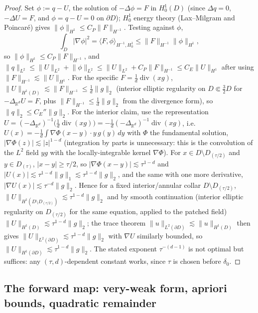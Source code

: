 \documentclass[11pt]{article}
\theoremstyle{remark}
\newcommand{\R}{\mathbb{R}}
\newcommand{\norm}[1]{\lVert #1\rVert}
\newcommand{\abs}[1]{\lvert #1\rvert}
\newcommand{\inner}[2]{\langle #1,#2\rangle}
\DeclareMathOperator{\diver}{div}
\begin{document}
\begin{proof}
Set $\phi:=q-U$, the solution of $-\Delta\phi=F$ in $H^{1}_{0}(D)$
(since $\Delta q=0$, $-\Delta U=F$, and $\phi=q-U=0$ on $\partial D$);
$H^{1}_0$ energy theory (Lax--Milgram and Poincar\'e) gives
$\norm{\phi}_{H^{1}}\le C_P\norm{F}_{H^{-1}}$. Testing against $\phi$,
\[
\int_D\abs{\nabla\phi}^{2}
=\inner{F}{\phi}_{H^{-1},H^{1}_0}
\le\norm{F}_{H^{-1}}\norm{\phi}_{H^{1}},
\]
so $\norm{\phi}_{H^{1}}\le C_P\norm{F}_{H^{-1}}$, and
$\norm{q}_{L^{2}}\le\norm{U}_{L^{2}}+\norm{\phi}_{L^{2}}
\le\norm{U}_{L^{2}}+C_P\norm{F}_{H^{-1}}
\le C_E\norm{U}_{H^{1}}$ after using
$\norm{F}_{H^{-1}}\lesssim\norm{U}_{H^{1}}$.
For the specific $F=\frac1d\diver(xg)$,
$\norm{U}_{H^{1}(D)}\lesssim\norm{F}_{H^{-1}}\le\frac1d\norm g_2$
(interior elliptic regularity on $D\Subset\tfrac32 D$ for
$-\Delta_{\R^{d}}U=F$, plus $\norm{F}_{H^{-1}}\le\frac1d\norm g_2$ from
the divergence form), so $\norm{q}_{2}\le C_E''\norm{g}_{2}$.
\smallskip
For the interior claim, use the representation
$U=(-\Delta_{\R^d})^{-1}\bigl(\tfrac1d\diver(xg)\bigr)
=-\frac1d(-\Delta_{\R^d})^{-1}\diver(xg)$, i.e.\
$U(x)=-\frac1d\int\nabla\Phi(x-y)\cdot y\,g(y)\,dy$ with $\Phi$ the
fundamental solution, $\abs{\nabla\Phi(z)}\lesssim\abs z^{1-d}$
(integration by parts is unnecessary: this is the convolution of the
$L^{2}$ field $yg$ with the locally-integrable kernel
$\nabla\Phi$). For $x\in D\setminus D_{(\tau/2)}$ and
$y\in D_{(\tau)}$, $\abs{x-y}\ge\tau/2$, so
$\abs{\nabla\Phi(x-y)}\lesssim\tau^{1-d}$ and
$\abs{U(x)}\lesssim\tau^{1-d}\norm{g}_1\lesssim\tau^{1-d}\norm g_2$,
and the same with one more derivative,
$\abs{\nabla U(x)}\lesssim\tau^{-d}\norm g_2$. Hence for a fixed
interior/annular collar $D\setminus D_{(\tau/2)}$,
$\norm{U}_{H^{1}(D\setminus D_{(\tau/2)})}\lesssim\tau^{1-d}\norm g_2$
and by smooth continuation (interior elliptic regularity on
$D_{(\tau/2)}$ for the same equation, applied to the patched field)
$\norm{U}_{H^{1}(D)}\lesssim\tau^{1-d}\norm g_2$; the trace theorem
$\norm{u}_{L^{2}(\partial D)}\lesssim\norm u_{H^{1}(D)}$ then gives
$\norm U_{L^{2}(\partial D)}\lesssim\tau^{1-d}\norm g_2$ with $\nabla U$
similarly bounded, so
$\norm U_{H^{1}(\partial D)}\lesssim\tau^{1-d}\norm g_2$. The stated
exponent $\tau^{-(d-1)}$ is not optimal but suffices: any
$(\tau,d)$-dependent constant works, since $\tau$ is chosen before
$\delta_0$.
\end{proof}

\subsection{The forward map: very-weak form, apriori bounds, quadratic
remainder}\label{sec:forward}
\end{document}
